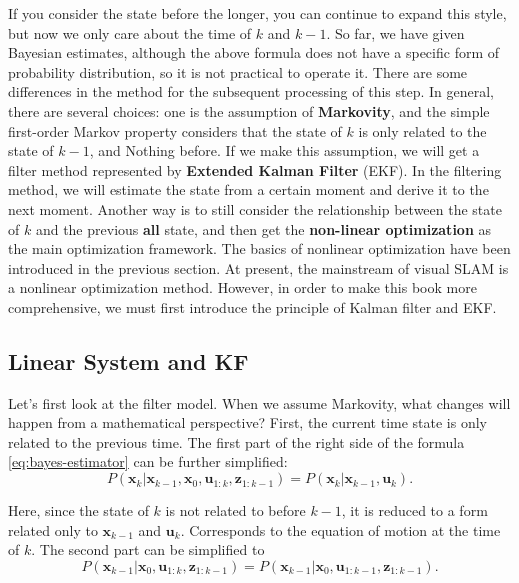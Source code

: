 If you consider the state before the longer, you can continue to expand this style, but now we only care about the time of $k$ and $k-1$. So far, we have given Bayesian estimates, although the above formula does not have a specific form of probability distribution, so it is not practical to operate it. There are some differences in the method for the subsequent processing of this step. In general, there are several choices: one is the assumption of \textbf{Markovity}, and the simple first-order Markov property considers that the state of $k$ is only related to the state of $k-1$, and Nothing before. If we make this assumption, we will get a filter method represented by \textbf{Extended Kalman Filter} (EKF). In the filtering method, we will estimate the state from a certain moment and derive it to the next moment. Another way is to still consider the relationship between the state of $k$ and the previous \textbf{all} state, and then get the \textbf{non-linear optimization} as the main optimization framework. The basics of nonlinear optimization have been introduced in the previous section. At present, the mainstream of visual SLAM is a nonlinear optimization method. However, in order to make this book more comprehensive, we must first introduce the principle of Kalman filter and EKF.

\subsection{Linear System and KF}
Let's first look at the filter model. When we assume Markovity, what changes will happen from a mathematical perspective? First, the current time state is only related to the previous time. The first part of the right side of the formula \eqref{eq:bayes-estimator} can be further simplified:
\begin{equation}
P\left( {{\bm{x}_k}|{\bm{x}_{k - 1}},{\bm{x}_0},{\bm{u}_{1:k}},{\bm{z}_{1:k - 1}}} \right) = P\left( {{\bm{x}_k}|{\bm{x}_{k - 1}},{\bm{u}_k}} \right).
\end{equation}

Here, since the state of $k$ is not related to before $k-1$, it is reduced to a form related only to $\bm{x}_{k-1}$ and $\bm{u}_k$. Corresponds to the equation of motion at the time of ${k}$. The second part can be simplified to
\begin{equation}
P\left( {{\bm{x}_{k - 1}}|{\bm{x}_0},{\bm{u}_{1:k}},{\bm{z}_{1:k - 1}}} \right) = P\left( {{\bm{x}_{k - 1}}|{\bm{x}_0},{\bm{u}_{1:k - 1}},{\bm{z}_{1:k - 1}}} \right).
\end{equation}

